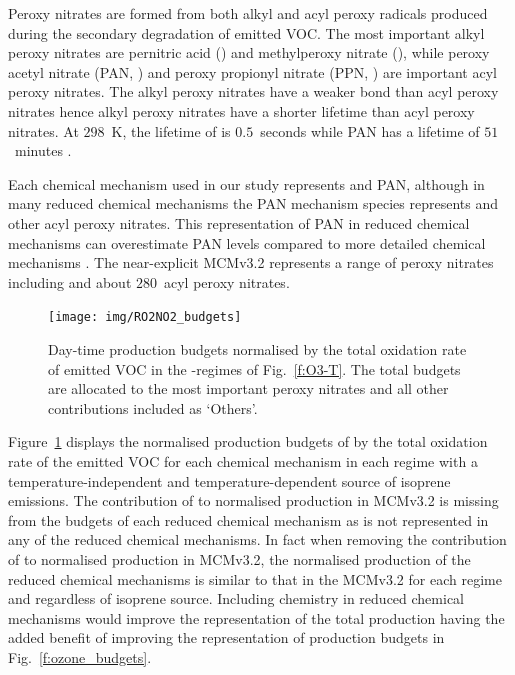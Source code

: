 Peroxy nitrates are formed from both alkyl and acyl peroxy radicals produced during the secondary degradation of emitted VOC.
The most important alkyl peroxy nitrates are pernitric acid () and methylperoxy nitrate (), while peroxy acetyl nitrate (PAN, ) and peroxy propionyl nitrate (PPN, ) are important acyl peroxy nitrates.
The alkyl peroxy nitrates have a weaker  bond than acyl peroxy nitrates hence alkyl peroxy nitrates have a shorter lifetime than acyl peroxy nitrates.
At $298$~K, the lifetime of  is $0.5$~seconds while PAN has a lifetime of $51$~minutes \citep{Orlando:2012}.

Each chemical mechanism used in our study represents  and PAN, although in many reduced chemical mechanisms the PAN mechanism species represents  and other acyl peroxy nitrates.
This representation of PAN in reduced chemical mechanisms can overestimate PAN levels compared to more detailed chemical mechanisms \citep{Luecken:1999}.
The near-explicit MCMv3.2 represents a range of peroxy nitrates including  and about $280$~acyl peroxy nitrates.

\begin{figure}[t]%
    \centering%
    \caption{Day-time  production budgets normalised by the total oxidation rate of emitted VOC in the -regimes of Fig.~\ref{f:O3-T}. The total budgets are allocated to the most important peroxy nitrates and all other contributions included as `Others'.}%
    \label{f:ro2no2_budgets}%
    \texttt{[image: img/RO2NO2\_budgets]}
\end{figure}

Figure~\ref{f:ro2no2_budgets} displays the normalised production budgets of  by the total oxidation rate of the emitted VOC for each chemical mechanism in each  regime with a temperature-independent and temperature-dependent source of isoprene emissions.
The contribution of  to normalised  production in MCMv3.2 is missing from the budgets of each reduced chemical mechanism as  is not represented in any of the reduced chemical mechanisms.
In fact when removing the contribution of  to normalised  production in MCMv3.2, the normalised  production of the reduced chemical mechanisms is similar to that in the MCMv3.2 for each  regime and regardless of isoprene source.  
Including  chemistry in reduced chemical mechanisms would improve the representation of the total  production having the added benefit of improving the representation of  production budgets in Fig.~\ref{f:ozone_budgets}.

